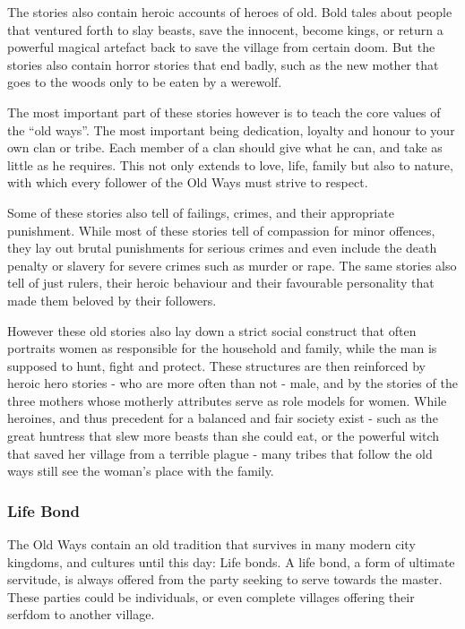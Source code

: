 The stories also contain heroic accounts of heroes of old. Bold tales about
people that ventured forth to slay beasts, save the innocent, become kings, or
return a powerful magical artefact back to save the village from certain doom.
But the stories also contain horror stories that end badly, such as the new
mother that goes to the woods only to be eaten by a werewolf.

The most important part of these stories however is to teach the core values
of the ``old ways''. The most important being dedication, loyalty and honour
to your own clan or tribe. Each member of a clan should give what he can, and
take as little as he requires. This not only extends to love, life, family but
also to nature, with which every follower of the Old Ways must strive to
respect.

Some of these stories also tell of failings, crimes, and their appropriate
punishment. While most of these stories tell of compassion for minor offences,
they lay out brutal punishments for serious crimes and even include the death
penalty or slavery for severe crimes such as murder or rape. The same stories
also tell of just rulers, their heroic behaviour and their favourable
personality that made them beloved by their followers.

However these old stories also lay down a strict social construct that often
portraits women as responsible for the household and family, while the man is
supposed to hunt, fight and protect. These structures are then reinforced by
heroic hero stories - who are more often than not - male, and by the stories
of the three mothers whose motherly attributes serve as role models for women.
While heroines, and thus precedent for a balanced and fair society exist - such
as the great huntress  that slew more beasts than she could
eat, or the powerful witch  that saved her village from a
terrible plague - many tribes that follow the old ways still see the woman's
place with the family.

\subsubsection{Life Bond}
\label{sec:Life Bond}

The Old Ways contain an old tradition that survives in many modern city
kingdoms, and cultures until this day: Life bonds. A life bond, a form of
ultimate servitude, is always offered from the party seeking to serve towards
the master. These parties could be individuals, or even complete villages
offering their serfdom to another village.

